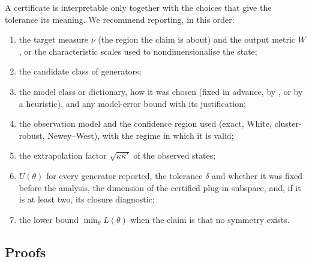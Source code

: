 A certificate is interpretable only together with the choices that give the
tolerance its meaning. We recommend reporting, in this order:
\begin{enumerate}\itemsep1pt
\item the target measure $\nu$ (the region the claim is about) and the output
  metric $W$, or the characteristic scales used to nondimensionalise the state;
\item the candidate class of generators;
\item the model class or dictionary, how it was chosen (fixed in advance, by
  , or by a heuristic), and any model-error bound with its
  justification;
\item the observation model and the confidence region used (exact, White,
  cluster-robust, Newey--West), with the regime in which it is valid;
\item the extrapolation factor $\sqrt{\kappa\kappa'}$ of the observed states;
\item $U(\theta)$ for every generator reported, the tolerance $\delta$ and
  whether it was fixed before the analysis, the dimension of the certified
  plug-in subspace, and, if it is at least two, its closure diagnostic;
\item the lower bound $\min_\theta L(\theta)$ when the claim is that no
  symmetry exists.
\end{enumerate}

\subsection{Proofs}
\label{app:proofs}

